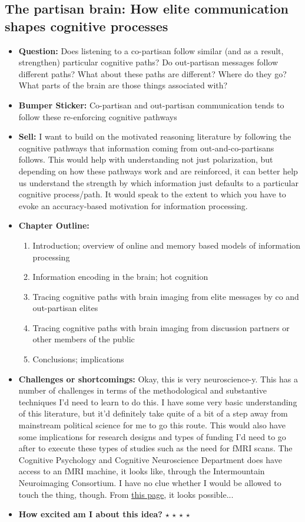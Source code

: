 \documentclass[12pt]{article}
\begin{document}
\subsection{The partisan brain: How elite communication shapes cognitive processes}
    \begin{itemize}
        \item \textbf{Question:} Does listening to a co-partisan follow similar (and as a result, strengthen) particular cognitive paths? Do out-partisan messages follow different paths? What about these paths are different? Where do they go? What parts of the brain are those things associated with?
        \item \textbf{Bumper Sticker:} Co-partisan and out-partisan communication tends to follow these re-enforcing cognitive pathways
        \item \textbf{Sell:} I want to build on the motivated reasoning literature by following the cognitive pathways that information coming from out-and-co-partisans follows. This would help with understanding not just polarization, but depending on how these pathways work and are reinforced, it can better help us understand the strength by which information just defaults to a particular cognitive process/path. It would speak to the extent to which you have to evoke an accuracy-based motivation for information processing.
        \item \textbf{Chapter Outline:}
        \begin{enumerate}
            \item Introduction; overview of online and memory based models of information processing
            \item Information encoding in the brain; hot cognition
            \item Tracing cognitive paths with brain imaging from elite messages by co and out-partisan elites
            \item Tracing cognitive paths with brain imaging from discussion partners or other members of the public
            \item Conclusions; implications
        \end{enumerate}
        \item \textbf{Challenges or shortcomings:} Okay, this is very neuroscience-y. This has a number of challenges in terms of the methodological and substantive techniques I'd need to learn to do this. I have some very basic understanding of this literature, but it'd definitely take quite of a bit of a step away from mainstream political science for me to go this route. This would also have some implications for research designs and types of funding I'd need to go after to execute these types of studies such as the need for fMRI scans. The Cognitive Psychology and Cognitive Neuroscience Department does have access to an fMRI machine, it looks like, through the Intermountain Neuroimaging Consortium. I have no clue whether I would be allowed to touch the thing, though. From \href{https://www.colorado.edu/mri/facilities-and-services}{this page}, it looks possible...
        \item \textbf{How excited am I about this idea?} $\star$ $\star$ $\star$ $\star$
    \end{itemize}
\end{document}
